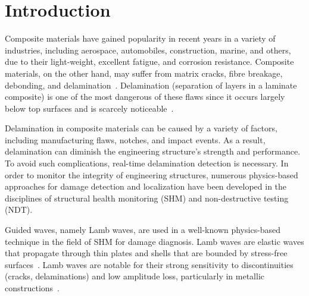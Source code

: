 \section{Introduction}
Composite materials have gained popularity in recent years in a variety of industries, including aerospace, automobiles, construction, marine, and others, due to their light-weight, excellent fatigue, and corrosion resistance.
Composite materials, on the other hand, may suffer from matrix cracks, fibre breakage, debonding, and delamination~\cite{ip2004delamination, smith2009composite}.
Delamination (separation of layers in a laminate composite) is one of the most dangerous of these flaws since it occurs largely below top surfaces and is scarcely noticeable~\cite{Cai2012a}.

Delamination in composite materials can be caused by a variety of factors, including manufacturing flaws, notches, and impact events.
As a result, delamination can diminish the engineering structure's strength and performance.
To avoid such complications, real-time delamination detection is necessary.
In order to monitor the integrity of engineering structures, numerous physics-based approaches for damage detection and localization have been developed in the disciplines of structural health monitoring (SHM) and non-destructive testing (NDT).

Guided waves, namely Lamb waves, are used in a well-known physics-based technique in the field of SHM for damage diagnosis.
Lamb waves are elastic waves that propagate through thin plates and shells that are bounded by stress-free surfaces~\cite{mitra2016guided}.
Lamb waves are notable for their strong sensitivity to discontinuities (cracks, delaminations) and low amplitude loss, particularly in metallic constructions~\cite{Keulen2014}.


